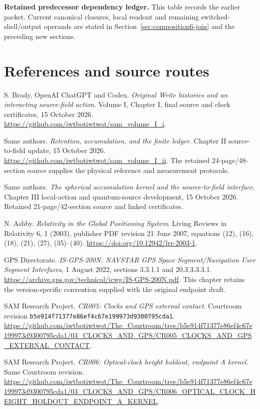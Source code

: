 \documentclass[10pt,twocolumn,letterpaper]{article}
\begin{document}

\clearpage\onecolumn
\par\noindent\textbf{Retained predecessor dependency ledger.} This table records the earlier packet. Current canonical closures, local readout and remaining switched-shell/output operands are stated in Section~\ref{sec:composition6-join} and the preceding new sections.\par

\clearpage\twocolumn
\section*{References and source routes}
\begingroup\footnotesize\raggedright
\noindent[1] S. Brady, OpenAI ChatGPT and Codex. \emph{Original Write histories and an interacting source-field action}. Volume I, Chapter I, final source and clock certificates, 15 October 2026. \url{https://github.com/iwtbotiwtwot/sam_volume_I_i}.

\noindent[2] Same authors. \emph{Retention, accumulation, and the finite ledger}. Chapter II source-to-field update, 15 October 2026. \url{https://github.com/iwtbotiwtwot/sam_volume_I_ii}. The retained 24-page/48-section source supplies the physical reference and measurement protocols.

\noindent[3] Same authors. \emph{The spherical accumulation kernel and the source-to-field interface}. Chapter III local-action and quantum-source development, 15 October 2026. Retained 21-page/42-section source and linked certificates.

\noindent[4] N. Ashby. \emph{Relativity in the Global Positioning System}. Living Reviews in Relativity 6, 1 (2003), publisher PDF revision 21 June 2007, equations (12), (16), (18), (21), (27), (35)--(40). \url{https://doi.org/10.12942/lrr-2003-1}.

\noindent[5] GPS Directorate. \emph{IS-GPS-200N: NAVSTAR GPS Space Segment/Navigation User Segment Interfaces}, 1 August 2022, sections 3.3.1.1 and 20.3.3.3.3.1. \url{https://archive.gps.gov/technical/icwg/IS-GPS-200N.pdf}. This chapter retains the version-specific convention supplied with the original endpoint draft.

\noindent[6] SAM Research Project. \emph{CR005: Clocks and GPS external contact}. Courtroom revision \nolinkurl{b5e914f71377e86ef4c67e199973d9300795cda1}. \url{https://github.com/iwtbotiwtwot/The_Courtroom/tree/b5e914f71377e86ef4c67e199973d9300795cda1/03_CLOCKS_AND_GPS/CR005_CLOCKS_AND_GPS_EXTERNAL_CONTACT}.

\noindent[7] SAM Research Project. \emph{CR006: Optical-clock height holdout, endpoint A kernel}. Same Courtroom revision. \url{https://github.com/iwtbotiwtwot/The_Courtroom/tree/b5e914f71377e86ef4c67e199973d9300795cda1/03_CLOCKS_AND_GPS/CR006_OPTICAL_CLOCK_HEIGHT_HOLDOUT_ENDPOINT_A_KERNEL}.
\end{document}
